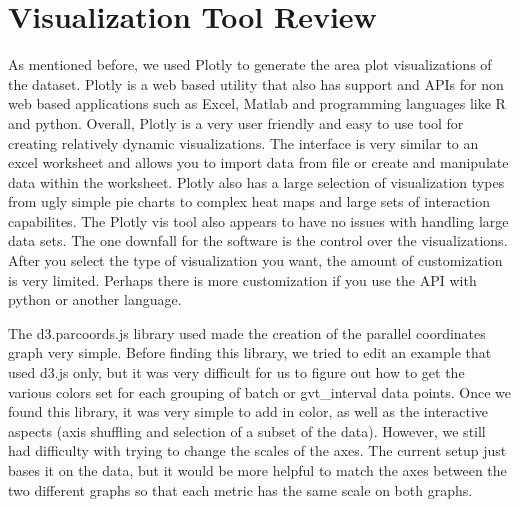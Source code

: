 \documentclass[12pt]{article}
\begin{document}
\section{Visualization Tool Review}
As mentioned before, we used Plotly to generate the area plot visualizations of the dataset. Plotly is a web based utility that also has support and APIs for non web based applications such as Excel, Matlab and programming languages like R and python. Overall, Plotly is a very user friendly and easy to use tool for creating relatively dynamic visualizations. The interface is very similar to an excel worksheet and allows you to import data from file or create and manipulate data within the worksheet. Plotly also has a large selection of visualization types from ugly simple pie charts to complex heat maps and large sets of interaction capabilites. The Plotly vis tool also appears to have no issues with handling large data sets. The one downfall for the software is the control over the visualizations. After you select the type of visualization you want, the amount of customization is very limited. Perhaps there is more customization if you use the API with python or another language. 

The d3.parcoords.js library used made the creation of the parallel coordinates graph very simple.  Before finding this library, we tried to edit an example that used d3.js only, but it was very difficult for us to figure out how to get the various colors set for each grouping of batch or gvt\_interval data points.  Once we found this library, it was very simple to add in color, as well as the interactive aspects (axis shuffling and selection of a subset of the data).  However, we still had difficulty with trying to change the scales of the axes.  The current setup just bases it on the data, but it would be more helpful to match the axes between the two different graphs so that each metric has the same scale on both graphs.  



\end{document}
